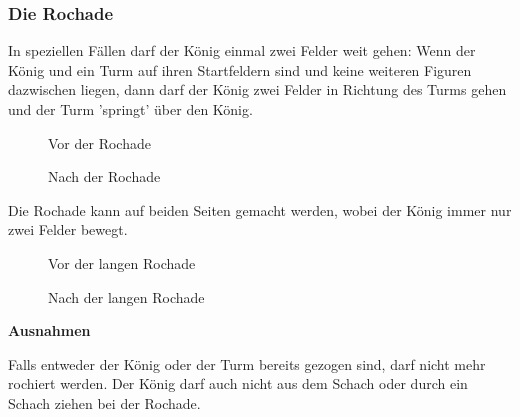 \documentclass{article}
\begin{document}
\subsubsection{Die Rochade}\label{rochade}
In speziellen Fällen darf der König einmal zwei Felder weit gehen: Wenn der König und ein Turm auf ihren Startfeldern sind und keine weiteren Figuren dazwischen liegen, dann darf der König zwei Felder in Richtung des Turms gehen und der Turm 'springt' über den König. 
\begin{multicols}{2}
\begin{figure}[H]
\centering
\chessboard[
smallboard,
setpieces={Rh1,Ke1},
arrow=to,linewidth=0.2ex,
pgfstyle=straightmove,
shortenstart=0.4em,
color=red!80,
markmoves={e1-g1},
]
\caption{Vor der Rochade}
\end{figure}
\vfill\null
\columnbreak
\begin{figure}[H]
\centering
\chessboard[
smallboard,
setpieces={Rf1,Kg1},
]
\caption{Nach der Rochade}
\end{figure}
\end{multicols}

Die Rochade kann auf beiden Seiten gemacht werden, wobei der König immer nur zwei Felder bewegt.

\begin{multicols}{2}
\begin{figure}[H]
\centering
\chessboard[
smallboard,
setpieces={Ra1,Ke1},
arrow=to,linewidth=0.2ex,
pgfstyle=straightmove,
shortenstart=0.4em,
color=red!80,
markmoves={e1-c1},
]
\caption{Vor der langen Rochade}
\end{figure}
\vfill\null
\columnbreak
\begin{figure}[H]
\centering
\chessboard[
smallboard,
setpieces={Rd1,Kc1},
]
\caption{Nach der langen Rochade}
\end{figure}
\end{multicols}

\newpage
{\bf Ausnahmen}

Falls entweder der König oder der Turm bereits gezogen sind, darf nicht mehr rochiert werden. Der König darf auch nicht aus dem Schach oder durch ein Schach ziehen bei der Rochade.
\end{document}
